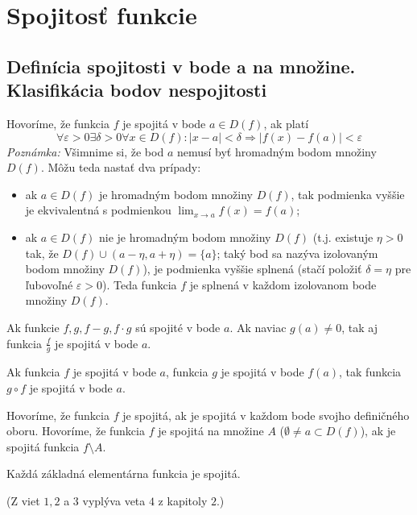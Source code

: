 \chapter{Spojitosť funkcie}%

\section{Definícia spojitosti v bode a na množine. Klasifikácia bodov nespojitosti}
Hovoríme, že funkcia $f$ je spojitá v bode $a \in D(f)$, ak platí
 $$\forall \varepsilon > 0 \exists \delta > 0 \forall x \in D(f):|x-a|<\delta \Rightarrow |f(x)-f(a)|< \varepsilon$$
 \textit{Poznámka:} Všimnime si, že bod $a$ nemusí byť hromadným bodom množiny $D(f)$. Môžu teda nastať dva prípady:
 \begin{itemize}
 \item ak $a \in D(f)$ je hromadným bodom množiny $D(f)$, tak podmienka vyššie je ekvivalentná s podmienkou $\lim_{x \rightarrow a} f(x)=f(a)$;
 \item ak $a \in D(f)$ nie je hromadným bodom množiny $D(f)$ (t.j. existuje $\eta > 0 $ tak, že $D(f) \cup (a-\eta,a+\eta)=\{ a\}$; taký bod sa nazýva izolovaným bodom množiny $D(f)$), je podmienka vyššie splnená (stačí položiť $\delta=\eta$ pre ľubovoľné $\varepsilon > 0$). Teda funkcia $f$ je splnená v každom izolovanom bode množiny $D(f)$.
 \end{itemize}
 
 \begin{veta}
 Ak funkcie $f,g,f-g,f \cdot g$ sú spojité v bode $a$. Ak naviac $g(a) \neq 0$, tak aj funkcia $\frac{f}{g}$ je spojitá v bode $a$.
 \end{veta}
 
 \begin{veta}
 Ak funkcia $f$ je spojitá v bode $a$, funkcia $g$ je spojitá v bode $f(a)$, tak funkcia $g \circ f$ je spojitá v bode $a$.
 
 Hovoríme, že funkcia $f$ je spojitá, ak je spojitá v každom bode svojho definičného oboru. Hovoríme, že funkcia $f$ je spojitá na množine $A$ ($\emptyset \neq a \subset D(f)$), ak je spojitá funkcia $f \setminus A$.
 \end{veta}
 
 \begin{veta}
 Každá základná elementárna funkcia je spojitá.
 \end{veta}
 
 (Z viet $1,2$ a $3$ vyplýva veta $4$ z kapitoly $2.$)
 
